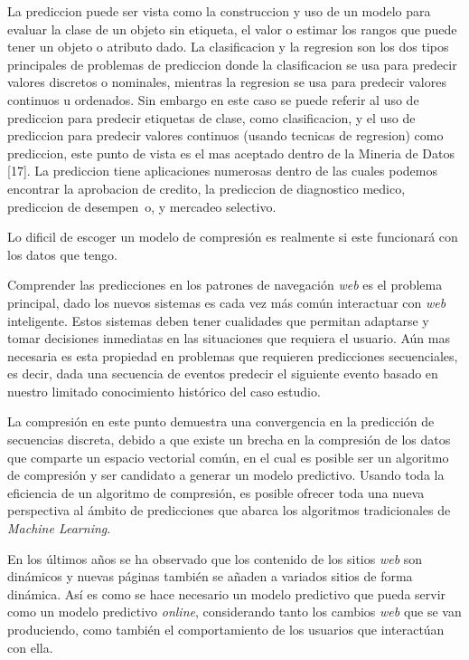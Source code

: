 La prediccion puede ser vista como la construccion y uso de un modelo para evaluar la clase de un objeto sin etiqueta, el valor o estimar los rangos que puede tener un objeto o atributo dado. La clasificacion y la regresion son los dos tipos principales de problemas de prediccion donde la clasificacion se usa para predecir valores discretos o nominales, mientras la regresion se usa para predecir valores continuos u ordenados. Sin embargo en este caso se puede referir al uso de prediccion para predecir etiquetas de clase, como clasificacion, y el uso de prediccion para predecir valores continuos (usando tecnicas de regresion) como prediccion, este punto de vista es el mas aceptado dentro de la Mineria de Datos [17]. La prediccion tiene aplicaciones numerosas dentro de las cuales podemos encontrar la aprobacion de credito, la prediccion de diagnostico medico, prediccion de desempen~o, y mercadeo selectivo.




Lo dificil de escoger un modelo de compresión es realmente si este funcionará con los datos que tengo.





Comprender las predicciones en los patrones de navegación \emph{web} es el problema principal, dado los nuevos sistemas es cada vez más común interactuar con \emph{web} inteligente. Estos sistemas deben tener cualidades que permitan adaptarse y tomar decisiones inmediatas en las situaciones que requiera el usuario. Aún mas necesaria es esta propiedad en problemas que requieren predicciones secuenciales, es decir, dada una secuencia de eventos  predecir el siguiente evento basado en nuestro limitado conocimiento histórico del caso estudio.

La compresión en este punto demuestra una convergencia en la predicción de secuencias discreta, debido a que existe un brecha en la compresión de los datos que comparte un espacio vectorial común, en el cual es posible ser un  algoritmo de compresión y ser candidato a generar un modelo predictivo. Usando toda la eficiencia de un algoritmo de compresión, es posible ofrecer toda una nueva perspectiva al ámbito de  predicciones que abarca los algoritmos tradicionales de \emph{Machine Learning}. 

En los últimos años se ha observado que  los contenido de los sitios \emph{web} son dinámicos y nuevas páginas también se añaden a variados sitios de forma dinámica. Así es como  se hace necesario un modelo predictivo que pueda servir como un modelo predictivo \emph{online},  considerando tanto los cambios \emph{web} que se van produciendo, como también el comportamiento de los usuarios que interactúan con ella. 

